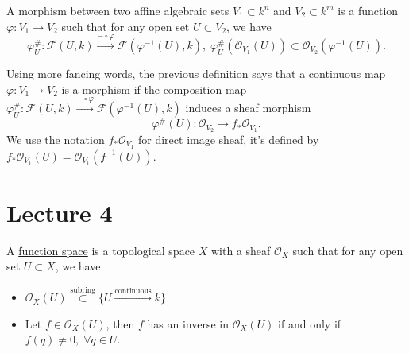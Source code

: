 \begin{dang}
    \begin{definition}
        A morphism between two affine algebraic sets $V_1\subset k^n$ and $V_2\subset k^m$ is a function 
        $\varphi:V_1\to V_2$ such that for any open set $U\subset V_2$, we have 
        \begin{equation}
            \varphi_U^{\#}:\mathcal{F}(U,k)\overset{-\circ\varphi}{\rightarrow}\mathcal{F}(\varphi^{-1}(U),k),\;
            \varphi_U^{\#}(\mathcal{O}_{V_1}(U))\subset \mathcal{O}_{V_2}(\varphi^{-1}(U)).
        \end{equation}
    \end{definition}
\end{dang}

Using more fancing words, the previous definition says that a continuous map $\varphi:V_1\to V_2$ is a morphism 
if the composition map $\varphi_U^{\#}:\mathcal{F}(U,k)\overset{-\circ\varphi}{\rightarrow}\mathcal{F}(\varphi^{-1}(U),k)$
induces a sheaf morphism 
\begin{equation}
    \varphi^\#(U):\mathcal{O}_{V_2}\to f_*\mathcal{O}_{V_1}.
\end{equation}
We use the notation $f_*\mathcal{O}_{V_1}$ for direct image sheaf, it's defined by 
$f_*\mathcal{O}_{V_1}(U)=\mathcal{O}_{V_1}(f^{-1}(U))$.


\section{Lecture 4}


\begin{dang}
    \begin{definition}
        A \underline{function space} is a topological space $X$ with a sheaf $\mathcal{O}_X$ such that 
        for any open set $U\subset X$, we have 
        \begin{itemize}
            \item[(1)] $\mathcal{O}_X(U)\overset{\text{subring}}{\subset} \{U\overset{\text{continuous}}{\to}k\}$
            \item[(2)] Let $f\in\mathcal{O}_X(U)$, then $f$ has an inverse in $\mathcal{O}_X(U)$ if and only if 
            $f(q)\neq0,\;\forall q\in U$.
        \end{itemize}
    \end{definition}
\end{dang}


